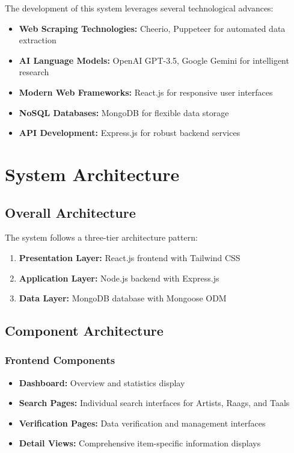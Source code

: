 \documentclass[12pt,a4paper]{article}
\begin{document}
The development of this system leverages several technological advances:

\begin{itemize}
    \item \textbf{Web Scraping Technologies:} Cheerio, Puppeteer for automated data extraction
    \item \textbf{AI Language Models:} OpenAI GPT-3.5, Google Gemini for intelligent research
    \item \textbf{Modern Web Frameworks:} React.js for responsive user interfaces
    \item \textbf{NoSQL Databases:} MongoDB for flexible data storage
    \item \textbf{API Development:} Express.js for robust backend services
\end{itemize}

\section{System Architecture}

\subsection{Overall Architecture}

The system follows a three-tier architecture pattern:

\begin{enumerate}
    \item \textbf{Presentation Layer:} React.js frontend with Tailwind CSS
    \item \textbf{Application Layer:} Node.js backend with Express.js
    \item \textbf{Data Layer:} MongoDB database with Mongoose ODM
\end{enumerate}

\subsection{Component Architecture}

\subsubsection{Frontend Components}

\begin{itemize}
    \item \textbf{Dashboard:} Overview and statistics display
    \item \textbf{Search Pages:} Individual search interfaces for Artists, Raags, and Taals
    \item \textbf{Verification Pages:} Data verification and management interfaces
    \item \textbf{Detail Views:} Comprehensive item-specific information displays
\end{itemize}
\end{document}
